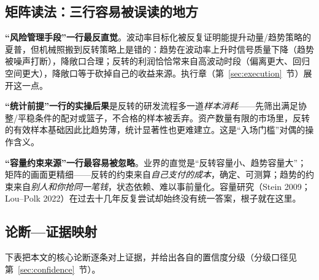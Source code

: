 \subsection{矩阵读法：三行容易被误读的地方}

\textbf{“风险管理手段”一行最反直觉}。波动率目标化被反复证明能提升动量/趋势策略的夏普\cite{barroso2015,harvey2018,moreiramuir2017}，但机械照搬到反转策略上是错的：趋势在波动率上升时信号质量下降（趋势被噪声打断），降敞口合理；反转的利润恰恰常来自高波动时段（偏离更大、回归空间更大），降敞口等于砍掉自己的收益来源。执行章（第~\ref{sec:execution}~节）展开这一点。

\textbf{“统计前提”一行的实操后果}是反转的研发流程多一道\emph{样本消耗}——先筛出满足协整/平稳条件的配对或篮子，不合格的样本被丢弃。资产数量有限的市场里，反转的有效样本基础因此比趋势薄，统计显著性也更难建立。这是“入场门槛”对偶的操作含义。

\textbf{“容量约束来源”一行最容易被忽略}。业界的直觉是“反转容量小、趋势容量大”；矩阵的画面更精细——反转的约束来自\emph{自己支付的成本}，确定、可测算；趋势的约束来自\emph{别人和你抢同一笔钱}，状态依赖、难以事前量化。容量研究（Stein 2009；Lou--Polk 2022）\cite{stein2009,loupolk2022}在过去十几年反复尝试却始终没有统一答案，根子就在这里。

\subsection{论断—证据映射}

下表把本文的核心论断逐条对上证据，并给出各自的置信度分级（分级口径见第~\ref{sec:confidence}~节）。

